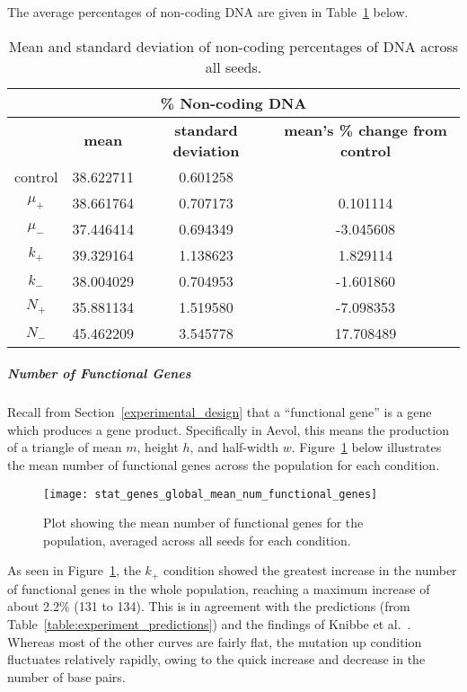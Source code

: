 The average percentages of non-coding DNA are given in Table~\ref{table:non-coding_DNA_mean_and_standard_deviation} below. 
\begin{table}[H]
	\begin{tabular}{|c|c|c|c|}
		\hline
		\multicolumn{4}{c}{\Large \textbf{\% Non-coding DNA}} \\
		\hline
		& \textbf{mean} & \textbf{standard deviation} & \textbf{mean's \% change from control} \\
		\hline \hline
		control & 38.622711 & 0.601258 & \textemdash \\ 
		\hline
		$\mu_+$ & 38.661764 & 0.707173 & 0.101114 \\ 
		\hline
		$\mu_-$ & 37.446414 & 0.694349 & -3.045608 \\ 
		\hline
		$k_+$ & 39.329164 & 1.138623 & 1.829114 \\ 
		\hline
		$k_-$ & 38.004029 & 0.704953 & -1.601860 \\ 
		\hline
		$N_+$ & 35.881134 & 1.519580 & -7.098353 \\ 
		\hline
		$N_-$ & 45.462209 & 3.545778 & 17.708489 \\ 
		\hline
	\end{tabular}
	\caption[Non-coding DNA mean and standard deviation]{Mean and standard deviation of non-coding percentages of DNA across all seeds.}
	\label{table:non-coding_DNA_mean_and_standard_deviation}
\end{table}

\subparagraph{Number of Functional Genes}\label{sec:number_of_functional_genes}
Recall from Section~\ref{experimental_design} that a ``functional gene'' is a gene which produces a gene product. Specifically in Aevol, this means the production of a triangle of mean $m$, height $h$, and half-width $w$. Figure~\ref{fig:mean_num_functional_genes} below illustrates the mean number of functional genes across the population for each condition.  
\begin{figure}[H]
	\centering
	\texttt{[image: stat\_genes\_global\_mean\_num\_functional\_genes]}
	\caption[Mean number of functional genes]{Plot showing the mean number of functional genes for the population, averaged across all seeds for each condition.}
	\label{fig:mean_num_functional_genes}
\end{figure}
As seen in Figure~\ref{fig:mean_num_functional_genes}, the $k_+$ condition showed the greatest increase in the number of functional genes in the whole population, reaching a maximum increase of about 2.2\% (131 to 134). This is in agreement with the predictions (from Table~\ref{table:experiment_predictions}) and the findings of Knibbe et al.~\cite{Knibbe2007}. Whereas most of the other curves are fairly flat, the mutation up condition fluctuates relatively rapidly, owing to the quick increase and decrease in the number of base pairs. 


